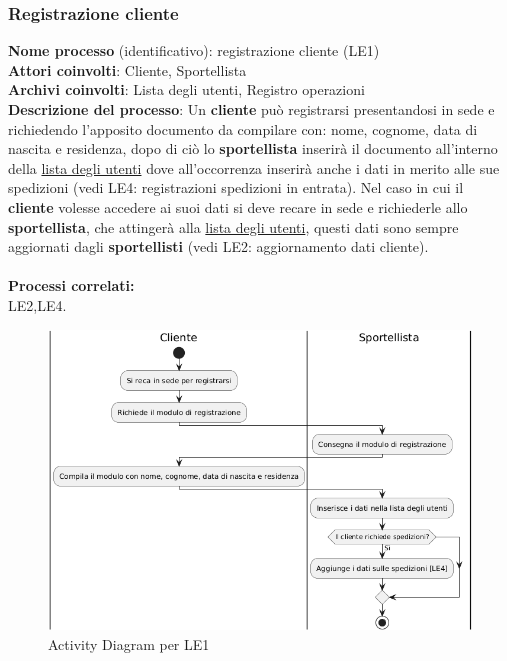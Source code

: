 \documentclass[a4paper,12pt]{article}
\begin{document}
\subsubsection{Registrazione cliente}
\textbf{Nome processo} (identificativo): registrazione cliente (LE1) \\
\textbf{Attori coinvolti}: Cliente, Sportellista \\
\textbf{Archivi coinvolti}: Lista degli utenti, Registro operazioni \\ 
\textbf{Descrizione del processo}:  Un \textbf{cliente} può registrarsi presentandosi in sede e richiedendo l'apposito documento da compilare con: 
nome, cognome, data di nascita e residenza, dopo di ciò lo \textbf{sportellista} inserirà il documento all'interno della \underline{lista degli utenti} 
dove all'occorrenza inserirà anche i dati in merito alle sue spedizioni (vedi LE4: registrazioni spedizioni in entrata). Nel caso in cui il \textbf{cliente} 
volesse accedere ai suoi dati si deve recare in sede e richiederle allo \textbf{sportellista}, che attingerà alla \underline{lista degli utenti}, questi dati 
sono sempre aggiornati dagli \textbf{sportellisti} (vedi LE2: aggiornamento dati cliente). \\ \\
\textbf{Processi correlati:}\\LE2,LE4.\\
\begin{figure}[H]
	\centering
	\includegraphics[width=0.8\linewidth]{assets/activitydiagram_LE1.png}
	\caption{Activity Diagram per LE1}
\end{figure}

\newpage
\end{document}
